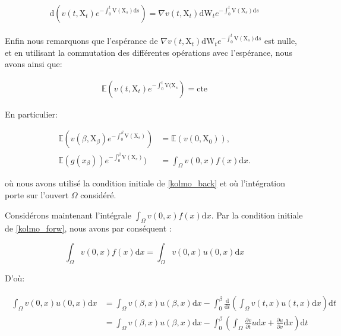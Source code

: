\documentclass[11pt]{article}
\theoremstyle{definition}
\theoremstyle{remark}
\begin{document}
\begin{align}
\mathrm{d}(v(t, \mathrm{X}_{t}) e^{-\int_0^{t} \mathrm{V}(\mathrm{X}_{s}) \mathrm{d}s}) = \nabla v(t, \mathrm{X}_t)\mathrm{dW}_{t} e^{-\int_0^{t} \mathrm{V}(\mathrm{X}_{s}) \mathrm{d}s}
\end{align}

Enfin nous remarquons que l’espérance de $\nabla v(t, \mathrm{X}_t)\mathrm{dW}_{t} e^{-\int_0^{t} \mathrm{V}(\mathrm{X}_{s}) \mathrm{d}s}$ est nulle, et en utilisant la commutation des différentes opérations avec l’espérance, nous avons ainsi que: 

\begin{align}
\mathbb{E}(v(t , \mathrm{X}_{t})e^{-\int_0^{t} \mathrm{V}(\mathrm{X}_{s}}) = \mathrm{cte}
\end{align}

En particulier:

\begin{align}
\mathbb{E}(v(\beta , \mathrm{X}_{\beta})e^{-\int_0^{\beta} \mathrm{V}(\mathrm{X}_{s})}) &= \mathbb{E}(v(0, \mathrm{X}_0)), \\
\mathbb{E}(g(x_{\beta}))e^{-\int_0^{\beta} \mathrm{V}(\mathrm{X}_{s})}) &= \int_{\Omega} v(0,x) f(x) \mathrm{d}x.
\end{align}

où nous avons utilisé la condition initiale de \eqref{kolmo_back} et où l’intégration porte sur l'ouvert $\Omega$ considéré. 

Considérons maintenant l'intégrale $\int_{\Omega} v(0,x) f(x) \mathrm{d}x$. Par la condition initiale de \eqref{kolmo_forw}, nous avons par conséquent :

\begin{equation}
\int_{\Omega} v(0,x) f(x) \mathrm{d}x = \int_{\Omega} v(0,x) u(0,x) \mathrm{d}x
\end{equation}

D'où:

\begin{align}
\label{expansion_integral_vu}
\begin{split}
\int_{\Omega} v(0,x) u(0,x) \mathrm{d}x &= \int_{\Omega} v(\beta, x) u(\beta,x) \mathrm{d}x - \int_{0}^{\beta} \frac{\mathrm{d}}{\mathrm{d}t}\left(\int_{\Omega} v(t,x) u(t,x) \mathrm{d}x \right) \mathrm{d}t \\
&= \int_{\Omega} v(\beta, x) u(\beta,x) \mathrm{d}x - \int_{0}^{\beta} \left( \int_{\Omega} \frac{\partial v}{\partial t} u \mathrm{d}x + \frac{\partial u}{\partial v} \mathrm{d}x \right) \mathrm{d}t
\end{split}
\end{align}
\end{document}

